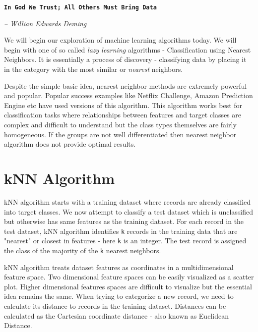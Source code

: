 \documentclass[10pt, letterpaper, twoside]{memoir}\usepackage{knitr}
\begin{document}
\begin{flushright}

\textbf{\texttt{In God We Trust; All Others Must Bring Data}}

\emph{-- Willian Edwards Deming}

\end{flushright}

\vspace{12pt}


We will begin our exploration of machine learning algorithms today. We will begin with one of so called \emph{lazy learning} algorithms - Classification using Nearest Neighbors. It is essentially a process of discovery - classifying data by placing it in the category with the most similar or \emph{nearest} neighbors.

Despite the simple basic idea, nearest neighbor methods are extremely powerful and popular. Popular success examples like Netflix Challenge, Amazon Prediction Engine etc have used versions of this algorithm. This algorithm works best for classification tasks where relationships between features and target classes are complex and difficult to understand but the class types themselves are fairly homogeneous. If the groups are not well differentiated then nearest neighbor algorithm does not provide optimal results.

\section{kNN Algorithm}

kNN algorithm starts with a training dataset where records are already classified into target classes. We now attempt to classify a test dataset which is unclassified but otherwise has same features as the training dataset. For each record in the test dataset, kNN algorithm identifies \verb|k| records in the training data that are "nearest" or closest in features - here \verb|k| is an integer. The test record is assigned the class of the majority of the \verb|k| nearest neighbors.

kNN algorithm treats dataset features as coordinates in a multidimensional feature space. Two dimensional feature spaces can be easily visualized as a scatter plot. Higher dimensional features spaces are difficult to visualize but the essential idea remains the same. When trying to categorize a new record, we need to calculate its distance to records in the training dataset. Distances can be calculated as the Cartesian coordinate distance - also known as Euclidean Distance.
\end{document}

